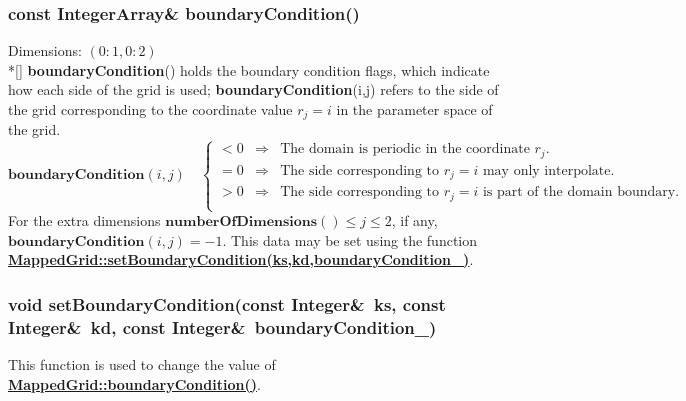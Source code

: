 \documentclass{article}
\begin{document}
  \subsubsection{const IntegerArray\& boundaryCondition()}
  \label{MappedGrid::boundaryCondition()}
    Dimensions: $(0\colon1,0\colon2)$ \\*[\parskip]
    \textbf{boundaryCondition}() holds the boundary condition flags,
    which indicate how each side of the grid is used;
    \textbf{boundaryCondition}(i,j) refers to the side of the grid corresponding to
    the coordinate value $r_j = i$ in the parameter space of the grid.
    \[\textbf{boundaryCondition}(i,j) \quad \left\{ \begin{array}{lll}
      < 0 & \Rightarrow & \mbox{The domain is periodic in the coordinate $r_j$.}                   \\
      = 0 & \Rightarrow & \mbox{The side corresponding to $r_j=i$ may only interpolate.}           \\
      > 0 & \Rightarrow & \mbox{The side corresponding to $r_j=i$ is part of the domain boundary.} \\
    \end{array} \right. \]
    For the extra dimensions $\textbf{numberOfDimensions}()\le j \le 2$, if any, $\textbf{boundaryCondition}(i,j)={-1}$.
    This data may be set using the function
    {\bf{}\hyperref{setBoundaryCondition(ks,kd,boundaryCondition\_)}{setBoundaryCondition(ks,kd,boundaryCondition\_) \rm(\S}{)}{MappedGrid::setBoundaryCondition(ks,kd,boundaryCondition_)}}.

  \subsubsection{void setBoundaryCondition(const Integer\&~ks, const Integer\&~kd, const Integer\&~boundaryCondition\_)}
  \label{MappedGrid::setBoundaryCondition(ks,kd,boundaryCondition_)}
    This function is used to change the value of
    {\bf{}\hyperref{boundaryCondition()}{boundaryCondition() \rm(\S}{)}{MappedGrid::boundaryCondition()}}.
\end{document}
